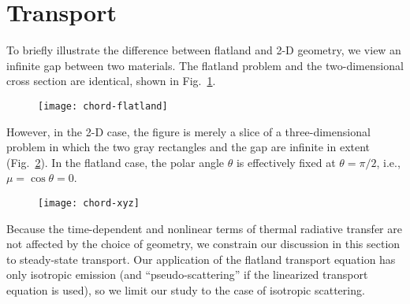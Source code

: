 \section{Transport}

To briefly illustrate the difference between flatland and 2-D geometry, we
view an infinite gap between two materials. The flatland problem and the
two-dimensional cross section are identical, shown in Fig.~\ref{fig:chordFlatland}.
%
\begin{figure}[tb]
  \centering
  \texttt{[image: chord-flatland]}
  \label{fig:chordFlatland}
\end{figure}
%
However, in the 2-D case, the figure is merely a slice of a three-dimensional
problem in which the two gray rectangles and the gap are infinite in extent
(Fig.~\ref{fig:chordXy}). In the flatland case, the polar angle $\theta$ is
effectively fixed at $\theta=\pi/2$, i.e., $\mu=\cos\theta = 0$.
%
\begin{figure}[htb]
  \centering
  \texttt{[image: chord-xyz]}
  \label{fig:chordXy}
\end{figure}

Because the time-dependent and nonlinear terms of thermal radiative transfer are
not affected by the choice of geometry, we constrain our discussion in this
section to steady-state transport. Our application of the flatland
transport equation
has only isotropic emission (and ``pseudo-scattering'' if the linearized
transport equation is used), so we limit our study to the case of isotropic
scattering.

